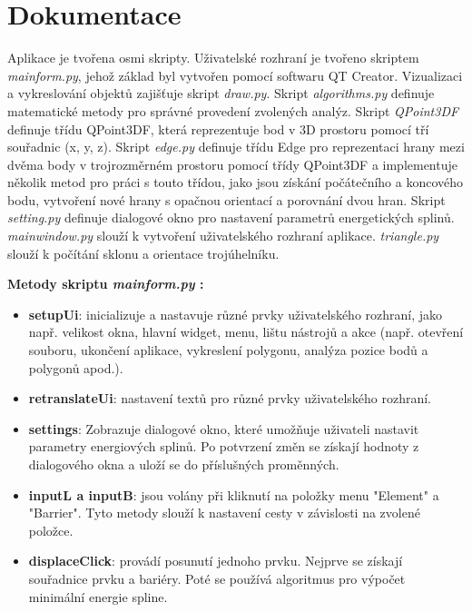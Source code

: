 \documentclass[a4paper,12pt]{article}
\begin{document}
{{{{{{    
    \newpage
    \section{Dokumentace}
        Aplikace je tvořena osmi skripty. Uživatelské rozhraní je tvořeno skriptem {\textit{mainform.py}}, jehož základ byl vytvořen pomocí softwaru QT Creator. Vizualizaci a vykreslování objektů zajišťuje skript {\textit{draw.py}}. Skript {\textit{algorithms.py}} definuje matematické metody pro správné provedení zvolených analýz. Skript {\textit{QPoint3DF}} definuje třídu QPoint3DF, která reprezentuje bod v 3D prostoru pomocí tří souřadnic (x, y, z). Skript {\textit{edge.py}} definuje třídu Edge pro reprezentaci hrany mezi dvěma body v trojrozměrném prostoru pomocí třídy QPoint3DF a implementuje několik metod pro práci s touto třídou, jako jsou získání počátečního a koncového bodu, vytvoření nové hrany s opačnou orientací a porovnání dvou hran. Skript {\textit{setting.py}} definuje dialogové okno pro nastavení parametrů energetických splinů. {\textit{mainwindow.py}} slouží k vytvoření uživatelského rozhraní aplikace. {\textit{triangle.py}} slouží k počítání sklonu a orientace trojúhelníku.
        
    \textbf{Metody skriptu \emph{mainform.py} :}
    \begin{itemize}
        \item \textbf{setupUi}: inicializuje a nastavuje různé prvky uživatelského rozhraní, jako např. velikost okna, hlavní widget, menu, lištu nástrojů a akce (např. otevření souboru, ukončení aplikace, vykreslení polygonu, analýza pozice bodů a polygonů apod.).
        
        \item \textbf{retranslateUi}: nastavení textů pro různé prvky uživatelského rozhraní.

        \item \textbf{settings}: Zobrazuje dialogové okno, které umožňuje uživateli nastavit parametry energiových splinů. Po potvrzení změn se získají hodnoty z dialogového okna a uloží se do příslušných proměnných.
        
        \item \textbf{inputL a inputB}: jsou volány při kliknutí na položky menu "Element" a "Barrier". Tyto metody slouží k nastavení cesty v závislosti na zvolené položce.

        \item \textbf{displaceClick}:  provádí posunutí jednoho prvku. Nejprve se získají souřadnice prvku a bariéry. Poté se používá algoritmus pro výpočet minimální energie spline.


\end{itemize}}}}}}}
\end{document}
